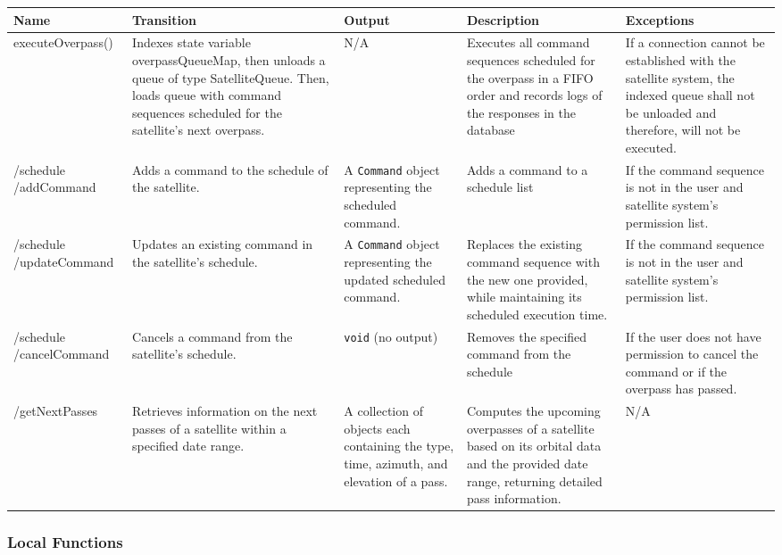 \documentclass[12pt, titlepage]{article}
\begin{document}
\begin{center}
\begin{tabular}{|p{3.2cm} |p{3cm} | p{2.3cm} |p{4cm} |p{4cm}|}
\hline
\textbf{Name} & \textbf{Transition} & \textbf{Output} & \textbf{Description} & \textbf{Exceptions} \\
\hline
executeOverpass() & Indexes state variable overpassQueueMap, then unloads a queue of type SatelliteQueue. Then, loads queue with command sequences scheduled for the satellite’s next overpass. & N/A & Executes all command sequences scheduled for the overpass in a FIFO order and records logs of the responses in the database & If a connection cannot be established with the satellite system, the indexed queue shall not be unloaded and therefore, will not be executed. \\
\hline
/schedule /addCommand & Adds a command to the schedule of the satellite. & A \texttt{Command} object representing the scheduled command. & Adds a command to a schedule list & If the command sequence is not in the user and satellite system's permission list. \\
\hline

/schedule /updateCommand & Updates an existing command in the satellite's schedule. & A \texttt{Command} object representing the updated scheduled command. & Replaces the existing command sequence with the new one provided, while maintaining its scheduled execution time. & If the command sequence is not in the user and satellite system's permission list. \\
\hline

/schedule /cancelCommand & Cancels a command from the satellite's schedule. & \texttt{void} (no output) & Removes the specified command from the schedule & If the user does not have permission to cancel the command or if the overpass has passed. \\
\hline

/getNextPasses & Retrieves information on the next passes of a satellite within a specified date range. &A collection of objects each containing the type, time, azimuth, and elevation of a pass. & Computes the upcoming overpasses of a satellite based on its orbital data and the provided date range, returning detailed pass information. & N/A \\
\hline
\end{tabular}
\end{center}

\subsubsection{Local Functions}
\end{document}
